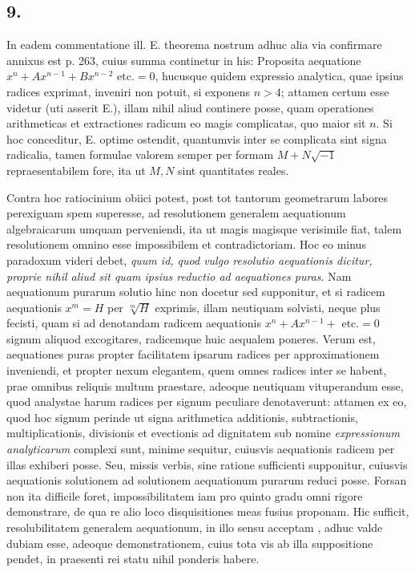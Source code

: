 \documentclass[14pt]{memoir}
\theoremstyle{plain}
\theoremstyle{remark}
\begin{document}
 
\subsection*{9.}

In eadem commentatione ill. \textsc{E.} theorema nostrum adhuc alia via confirmare annixus est p. 263, cuius summa continetur in his: Proposita aequatione \(x^n + Ax^{n-1} + B x^{n-2} \text{ etc.} = 0\), hucusque quidem expressio analytica, quae ipsius radices exprimat, inveniri non potuit, si exponens \(n>4\); attamen certum esse videtur (uti asserit \textsc{E.}), illam nihil aliud continere posse, quam operationes arithmeticas et extractiones radicum eo magis complicatas, quo maior sit \(n\). Si hoc conceditur, \textsc{E.} optime ostendit, quantumvis inter se complicata sint signa radicalia, tamen formulae valorem semper per formam \(M+N\surd{-1}\) repraesentabilem fore, ita ut \(M, N\) sint quantitates reales.

Contra hoc ratiocinium obiici potest, post tot tantorum geometrarum labores perexiguam spem superesse, ad resolutionem generalem aequationum algebraicarum umquam perveniendi, ita ut magis magisque verisimile fiat, talem resolutionem omnino esse impossibilem et contradictoriam. Hoc eo minus paradoxum videri debet, \textit{quum id, quod vulgo resolutio aequationis dicitur, proprie nihil aliud sit quam ipsius reductio ad aequationes puras}. Nam aequationum purarum solutio hinc non docetur sed supponitur, et si radicem aequationis \(x^m = H \) per \(\sqrt[m]{H}\) exprimis, illam neutiquam solvisti, neque plus fecisti, quam si ad denotandam radicem aequationis \(x^n + Ax^{n-1}+ \text{ etc.} = 0\) signum aliquod excogitares, radicemque huic aequalem poneres. Verum est, aequationes puras propter facilitatem ipsarum radices per approximationem inveniendi, et propter nexum elegantem, quem omnes radices inter se habent, prae omnibus reliquis multum praestare, adeoque neutiquam vituperandum esse, quod analystae harum radices per signum peculiare denotaverunt: attamen ex eo, quod hoc signum perinde ut signa arithmetica additionis, subtractionis, multiplicationis, divisionis et evectionis ad dignitatem sub nomine \textit{expressionum analyticarum} complexi sunt, minime sequitur, cuiusvis aequationis radicem per illas exhiberi posse. Seu, missis verbis, sine ratione sufficienti supponitur, cuiusvis aequationis solutionem ad solutionem aequationum purarum reduci posse. Forsan non ita difficile foret, impossibilitatem iam pro quinto gradu omni rigore demonstrare, de qua re alio loco disquisitiones meas fusius proponam. Hic sufficit, resolubilitatem generalem aequationum, in illo sensu acceptam , adhuc valde dubiam esse, adeoque demonstrationem, cuius tota vis ab illa suppositione pendet, in praesenti rei statu nihil ponderis habere.
\end{document}
